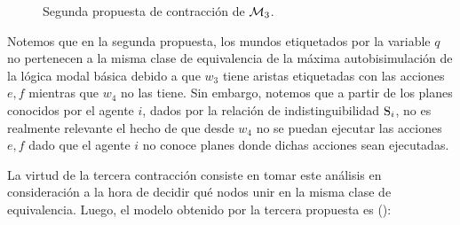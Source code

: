 \begin{figure}[h]
    \hspace{0.9cm}
    \vspace{0.4cm}
    \hspace{1.4cm}
    \caption{Segunda propuesta de contracción de $\modults_3$.}
    \label{fig:3rd-example-2nd-contraction}
\end{figure}

Notemos que en la segunda propuesta, los mundos etiquetados por la variable $q$ no pertenecen a la misma 
clase de equivalencia de la máxima autobisimulación de la lógica modal básica debido a que $w_3$ tiene aristas 
etiquetadas con las acciones $e, f$ mientras que $w_4$ no las tiene. Sin embargo, notemos que a partir de los planes  
conocidos por el agente $i$, dados por la relación de indistinguibilidad $\S_i$, no es realmente relevante el hecho de que desde $w_4$ no 
se puedan ejecutar las acciones $e, f$ dado que el agente $i$ no conoce planes donde dichas acciones sean ejecutadas. 

La virtud de la tercera contracción consiste en tomar este análisis en consideración a la hora de decidir qué nodos unir en la misma 
clase de equivalencia. Luego, el modelo obtenido por la tercera propuesta es ():

